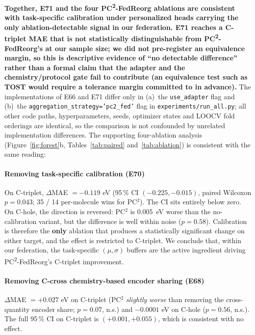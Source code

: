 \documentclass[11pt,a4paper]{article}
\newcommand{\PC}{PC\textsuperscript{2}-FedReorg}
\begin{document}
\textbf{Together, E71 and the four \PC{} ablations are consistent with task-specific calibration under personalized heads carrying the only ablation-detectable signal in our federation. E71 reaches a C-triplet MAE that is not statistically distinguishable from \PC{}'s at our sample size; we did not pre-register an equivalence margin, so this is descriptive evidence of ``no detectable difference'' rather than a formal claim that the adapter and the chemistry/protocol gate fail to contribute (an equivalence test such as TOST would require a tolerance margin committed to in advance).} The implementations of E66 and E71 differ only in (a)~the \texttt{use\_adapter} flag and (b)~the \texttt{aggregation\_strategy='pc2\_fed'} flag in \texttt{experiments/run\_all.py}; all other code paths, hyperparameters, seeds, optimizer states and LOOCV fold orderings are identical, so the comparison is not confounded by unrelated implementation differences. The supporting four-ablation analysis (Figure~\ref{fig:forest}b, Tables~\ref{tab:paired} and~\ref{tab:ablation}) is consistent with the same reading:

\paragraph{Removing task-specific calibration (E70)} On C-triplet, $\Delta$MAE $= -0.119$ eV (95\,\% CI $(-0.225, -0.015)$, paired Wilcoxon $p = 0.043$; 35 / 14 per-molecule wins for PC$^2$). The CI sits entirely below zero. On C-hole, the direction is reversed: PC$^2$ is \SI{0.005}{\eV} worse than the no-calibration variant, but the difference is well within noise ($p = 0.58$). Calibration is therefore the \textbf{only} ablation that produces a statistically significant change on either target, and the effect is restricted to C-triplet. We conclude that, within our federation, the task-specific $(\mu, \sigma)$ buffers are the active ingredient driving \PC{}'s C-triplet improvement.

\paragraph{Removing C-cross chemistry-based encoder sharing (E68)} $\Delta$MAE $= +0.027$ eV on C-triplet (PC$^2$ \emph{slightly worse} than removing the cross-quantity encoder share; $p = 0.07$, n.s.) and $-0.0001$ eV on C-hole ($p = 0.56$, n.s.). The full 95\,\% CI on C-triplet is $(+0.001, +0.055)$, which is consistent with no effect.
\end{document}
